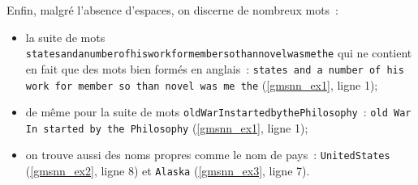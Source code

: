 Enfin, malgré l'absence d'espaces, on discerne de nombreux mots~:
\begin{itemize}
	\item la suite de mots \lstinline!statesandanumberofhisworkformembersothannovelwasmethe! qui ne contient en fait que des mots bien formés en anglais~: \lstinline!states and a number of his work for member so than novel was me the! (\autoref{gmsnn_ex1}, ligne 1);
	\item de même pour la suite de mots \lstinline!oldWarInstartedbythePhilosophy!~: \lstinline!old War In started by the Philosophy! (\autoref{gmsnn_ex1}, ligne 1);
	\item on trouve aussi des noms propres comme le nom de pays~: \lstinline!UnitedStates! (\autoref{gmsnn_ex2}, ligne 8) et \lstinline!Alaska! (\autoref{gmsnn_ex3}, ligne 7).
\end{itemize}